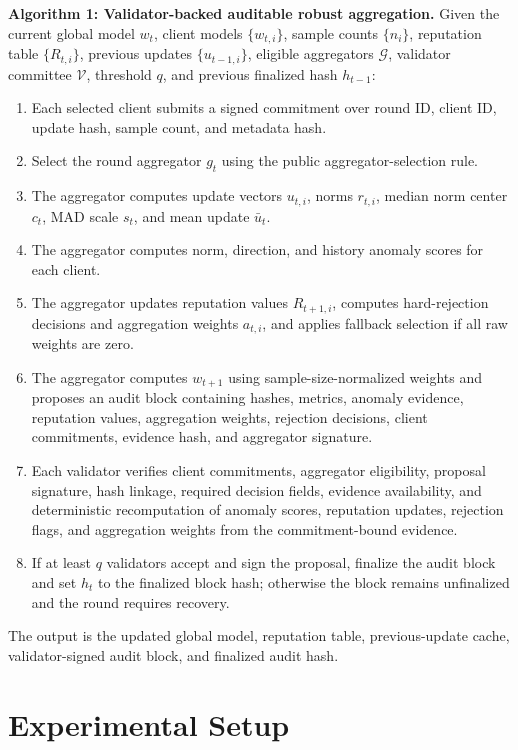 \documentclass[preprint,12pt]{elsarticle}
\begin{document}
\noindent\textbf{Algorithm 1: Validator-backed auditable robust aggregation.}
Given the current global model $w_t$, client models $\{w_{t,i}\}$, sample counts $\{n_i\}$, reputation table $\{R_{t,i}\}$, previous updates $\{u_{t-1,i}\}$, eligible aggregators $\mathcal{G}$, validator committee $\mathcal{V}$, threshold $q$, and previous finalized hash $h_{t-1}$:
\begin{enumerate}
  \item Each selected client submits a signed commitment over round ID, client ID, update hash, sample count, and metadata hash.
  \item Select the round aggregator $g_t$ using the public aggregator-selection rule.
  \item The aggregator computes update vectors $u_{t,i}$, norms $r_{t,i}$, median norm center $c_t$, MAD scale $s_t$, and mean update $\bar{u}_t$.
  \item The aggregator computes norm, direction, and history anomaly scores for each client.
  \item The aggregator updates reputation values $R_{t+1,i}$, computes hard-rejection decisions and aggregation weights $a_{t,i}$, and applies fallback selection if all raw weights are zero.
  \item The aggregator computes $w_{t+1}$ using sample-size-normalized weights and proposes an audit block containing hashes, metrics, anomaly evidence, reputation values, aggregation weights, rejection decisions, client commitments, evidence hash, and aggregator signature.
  \item Each validator verifies client commitments, aggregator eligibility, proposal signature, hash linkage, required decision fields, evidence availability, and deterministic recomputation of anomaly scores, reputation updates, rejection flags, and aggregation weights from the commitment-bound evidence.
  \item If at least $q$ validators accept and sign the proposal, finalize the audit block and set $h_t$ to the finalized block hash; otherwise the block remains unfinalized and the round requires recovery.
\end{enumerate}
The output is the updated global model, reputation table, previous-update cache, validator-signed audit block, and finalized audit hash.

\section{Experimental Setup}
\end{document}
